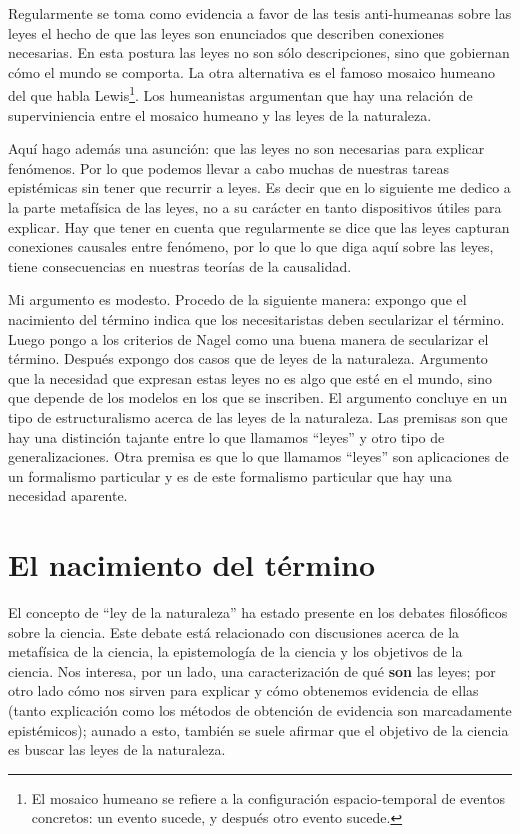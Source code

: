 \noindent Regularmente se toma como evidencia a favor de las tesis anti-humeanas sobre las leyes el hecho de que las leyes son enunciados que describen conexiones necesarias. En esta postura las leyes no son sólo descripciones, sino que gobiernan cómo el mundo se comporta\cite{Bhogal2020}. La otra alternativa es el famoso mosaico humeano del que habla Lewis\footnote{El mosaico humeano se refiere a la configuración espacio-temporal de eventos concretos: un evento sucede, y después otro evento sucede.}. Los humeanistas argumentan que hay una relación de superviniencia entre el mosaico humeano y las leyes de la naturaleza.

Aquí hago además una asunción: que las leyes no son necesarias para explicar fenómenos. Por lo que podemos llevar a cabo muchas de nuestras tareas epistémicas sin tener que recurrir a leyes. Es decir que en lo siguiente me dedico a la parte metafísica de las leyes, no a su carácter en tanto dispositivos útiles para explicar. Hay que tener en cuenta que regularmente se dice que las leyes capturan conexiones causales entre fenómeno, por lo que lo que diga aquí sobre las leyes, tiene consecuencias en nuestras teorías de la causalidad.

Mi argumento es modesto. Procedo de la siguiente manera: expongo que el nacimiento del término indica que los necesitaristas deben secularizar el término. Luego pongo a los criterios de Nagel como una buena manera de secularizar el término. Después expongo dos casos que de leyes de la naturaleza. Argumento que la necesidad que expresan estas leyes no es algo que esté en el mundo, sino que depende de los modelos en los que se inscriben. El argumento concluye en un tipo de estructuralismo acerca de las leyes de la naturaleza. Las premisas son que hay una distinción tajante entre lo que llamamos ``leyes'' y otro tipo de generalizaciones. Otra premisa es que lo que llamamos ``leyes'' son aplicaciones de un formalismo particular y es de este formalismo particular que hay una necesidad aparente.

\section{El nacimiento del término}

\noindent El concepto de ``ley de la naturaleza'' ha estado presente en los debates filosóficos sobre la ciencia. Este debate está relacionado con discusiones acerca de la metafísica de la ciencia, la epistemología de la ciencia y los objetivos de la ciencia. Nos interesa, por un lado, una caracterización de qué \textbf{son} las leyes; por otro lado cómo nos sirven para explicar y cómo obtenemos evidencia de ellas (tanto explicación como los métodos de obtención de evidencia son marcadamente epistémicos); aunado a esto, también se suele afirmar que el objetivo de la ciencia es buscar las leyes de la naturaleza.


